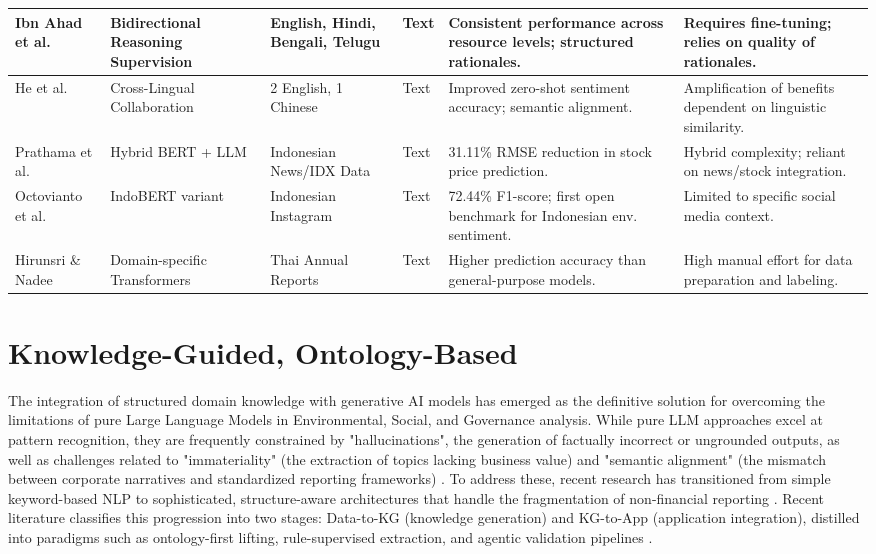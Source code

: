 \begin{landscape}
\begin{table}[p]
\begin{tabularx}{\linewidth}{|p{1.8cm}|p{3cm}|p{3cm}|p{1.8cm}|X|X|}
Ibn Ahad et al.  \parencite{association_for_computational_linguistics_2025_1ba46dee} & Bidirectional Reasoning Supervision & English, Hindi, Bengali, Telugu & Text & Consistent performance across resource levels; structured rationales. & Requires fine-tuning; relies on quality of rationales. \\ \hline
He et al.  \parencite{association_for_computational_linguistics_2025_5a25f994} & Cross-Lingual Collaboration & 2 English, 1 Chinese & Text & Improved zero-shot sentiment accuracy; semantic alignment. & Amplification of benefits dependent on linguistic similarity. \\ \hline
Prathama et al.  \parencite{ubaidillah_ariq_prathama_a1856e2f} & Hybrid BERT + LLM & Indonesian News/IDX Data & Text & 31.11\% RMSE reduction in stock price prediction. & Hybrid complexity; reliant on news/stock integration. \\ \hline
Octovianto et al.  \parencite{christofer_octovianto_487e90aa} & IndoBERT variant & Indonesian Instagram & Text & 72.44\% F1-score; first open benchmark for Indonesian env. sentiment. & Limited to specific social media context. \\ \hline
Hirunsri \& Nadee  \parencite{tharnsaithong_hirunsri_e4c4d75b} & Domain-specific Transformers & Thai Annual Reports & Text & Higher prediction accuracy than general-purpose models. & High manual effort for data preparation and labeling. \\ \hline
\end{tabularx}
\end{table}
\end{landscape}

\section{Knowledge-Guided, Ontology-Based}

The integration of structured domain knowledge with generative AI models has emerged as the definitive solution for overcoming the limitations of pure Large Language Models in Environmental, Social, and Governance analysis. While pure LLM approaches excel at pattern recognition, they are frequently constrained by "hallucinations", the generation of factually incorrect or ungrounded outputs, as well as challenges related to "immateriality" (the extraction of topics lacking business value) and "semantic alignment" (the mismatch between corporate narratives and standardized reporting frameworks)  \parencite[]{arash_hajikhani_cbb2528f, keane_ong_8fec4760}. To address these, recent research has transitioned from simple keyword-based NLP to sophisticated, structure-aware architectures that handle the fragmentation of non-financial reporting  \parencite[]{annas_vijaya_dc57c7ec, chaoyue_he_8c389604}. Recent literature classifies this progression into two stages: Data-to-KG (knowledge generation) and KG-to-App (application integration), distilled into paradigms such as ontology-first lifting, rule-supervised extraction, and agentic validation pipelines  \parencite{chaoyue_he_8c389604}.
